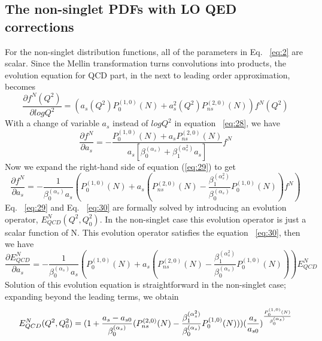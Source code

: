 \documentclass[review]{elsarticle}
\begin{document}
\subsection{The non-singlet PDFs with LO QED corrections}

For the non-singlet distribution functions, all of the parameters in
Eq. ~\eqref{eq:2} are scalar. Since the Mellin
transformation turns convolutions into products, the evolution equation
for QCD part, in the next to leading order approximation, becomes
\begin{equation}
\frac{\partial f^{N}(Q^{2})}{\partial logQ^{2}}=(a_{s}(Q^{2})P_{0}^{(1,0)}(N)+a_{s}^{2}(Q^{2})P_{ns}^{(2,0)}(N))f^{N}(Q^{2})\label{eq:28}
\end{equation}
With a change of variable $a_{s}$ instead of $logQ^{2}$ in equation
~\eqref{eq:28}, we have
\begin{equation}
\frac{\partial f^{N}}{\partial a_{s}}=-\frac{P_{0}^{(1,0)}(N)+a_{s}P_{ns}^{(2,0)}(N)}{a_{s}[\beta_{0}^{(\alpha_s)}+\beta_{1}^{(\alpha_s^2)}a_{s}]}f^{N}\label{eq:29}
\end{equation}
Now we expand the right-hand side of equation (\ref{eq:29}) to get
\begin{equation}
\frac{\partial f^{N}}{\partial a_{s}}=-\frac{1}{\beta_{0}^{(\alpha_s)}a_{s}}(P_{0}^{(1,0)}(N)+a_{s}(P_{ns}^{(2,0)}(N)-\frac{\beta_{1}^{(\alpha_s^2)}}{\beta_{0}^{(\alpha_s)}}P_{0}^{(1,0)}(N))f^{N})\label{eq:30}
\end{equation}
Eq. ~\eqref{eq:29} and Eq. ~\eqref{eq:30}
are formally solved by introducing an evolution operator, $E_{QCD}^{N}(Q^{2},Q_{0}^{2})$.
In the non-singlet case this evolution operator is just a scalar function
of N. This evolution operator satisfies the equation ~\eqref{eq:30},
then we have
\begin{equation}
\frac{\partial E_{QCD}^{N}}{\partial a_{s}}=-\frac{1}{\beta_{0}^{(\alpha_s)}a_{s}}(P_{0}^{(1,0)}(N)+a_{s}(P_{ns}^{(2,0)}(N)-\frac{\beta_{1}^{(\alpha_s^2)}}{\beta_{0}^{(\alpha_s)}}P_{0}^{(1,0)}(N)))E_{QCD}^{N}\label{eq:31}
\end{equation}
Solution of this evolution equation is straightforward in the non-singlet
case; expanding beyond the leading terms, we obtain \cite{Blumlein:1996gv,Gluck:1989ze,Gross:1973id,Politzer:1973fx,Jones:1974pg}
\begin{equation}
E_{QCD}^{N}(Q^{2},Q_{0}^{2})=(1+\frac{a_{s}-a_{s0}}{\beta_{0}^{(\alpha_s)}}\\
(P_{ns}^{(2,0)}(N)-\frac{\beta_{1}^{(\alpha_s^2)}}{\beta_{0}^{(\alpha_s)}}P_{0}^{(1,0)}(N)))(\frac{a_{s}}{a_{s0}})^{\frac{P_{0}^{(1,0)}(N)}{\beta_{0}^{(\alpha_s)}}}\label{eq:32}
\end{equation}
\end{document}
